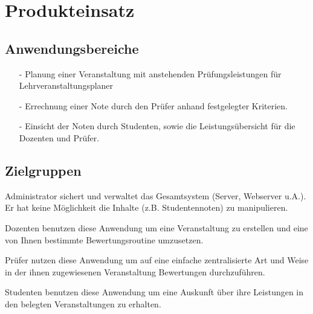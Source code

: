 		
	\section{Produkteinsatz}
	
		
		\subsection{Anwendungsbereiche}
		\begin{itemize}
		\item[-]	Planung einer Veranstaltung mit anstehenden Prüfungsleistungen für Lehrveranstaltungsplaner
		\item[-]	Errechnung einer Note durch den Prüfer anhand festgelegter Kriterien.
		\item[-]	Einsicht der Noten durch Studenten, sowie die Leistungsübersicht für die Dozenten und Prüfer.
		\end{itemize}
		
		
		\subsection{Zielgruppen}
		
		\begin{description}
		\item[Administrator] 	 Administrator sichert und verwaltet das Gesamtsystem (Server, Webserver u.A.). Er hat keine Möglichkeit die Inhalte (z.B. Studentennoten) zu manipulieren. 
		\item[Dozent]	Dozenten benutzen diese Anwendung um eine Veranstaltung zu erstellen und eine von Ihnen bestimmte Bewertungsroutine umzusetzen.
		\item[Prüfer] Prüfer nutzen diese Anwendung um auf eine einfache zentralisierte Art und Weise in der ihnen zugewiesenen Veranstaltung Bewertungen durchzuführen.
		\item[Studenten]	Studenten benutzen diese Anwendung um eine Auskunft über ihre Leistungen in den belegten Veranstaltungen zu erhalten.
		\end{description}

